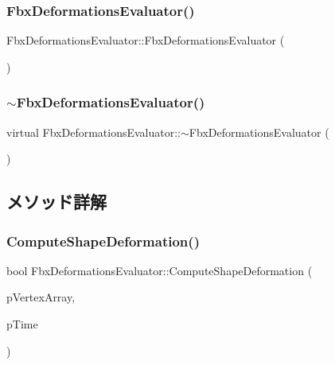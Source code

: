 \subsubsection{\texorpdfstring{Fbx\+Deformations\+Evaluator()}{FbxDeformationsEvaluator()}}
{\footnotesize\ttfamily Fbx\+Deformations\+Evaluator\+::\+Fbx\+Deformations\+Evaluator (\begin{DoxyParamCaption}{ }\end{DoxyParamCaption})}

\mbox{\label{class_fbx_deformations_evaluator_a1bcc75f8ee488dbddc55456292f227b3}} 
\subsubsection{\texorpdfstring{$\sim$\+Fbx\+Deformations\+Evaluator()}{~FbxDeformationsEvaluator()}}
{\footnotesize\ttfamily virtual Fbx\+Deformations\+Evaluator\+::$\sim$\+Fbx\+Deformations\+Evaluator (\begin{DoxyParamCaption}{ }\end{DoxyParamCaption})\hspace{0.3cm}{\ttfamily [virtual]}}



\subsection{メソッド詳解}
\mbox{\label{class_fbx_deformations_evaluator_a7f2053ca983b26ba4991c71663b25778}} 
\subsubsection{\texorpdfstring{Compute\+Shape\+Deformation()}{ComputeShapeDeformation()}}
{\footnotesize\ttfamily bool Fbx\+Deformations\+Evaluator\+::\+Compute\+Shape\+Deformation (\begin{DoxyParamCaption}\item[{\hyperlink{class_fbx_vector4}{Fbx\+Vector4} $\ast$}]{p\+Vertex\+Array,  }\item[{const \hyperlink{class_fbx_time}{Fbx\+Time} \&}]{p\+Time }\end{DoxyParamCaption})}

